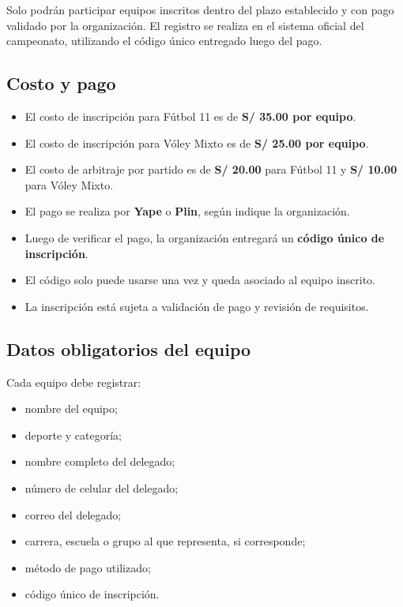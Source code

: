\documentclass[12pt,a4paper]{article}
\begin{document}
Solo podrán participar equipos inscritos dentro del plazo establecido y con pago validado por la organización. El registro se realiza en el sistema oficial del campeonato, utilizando el código único entregado luego del pago.

\subsection{Costo y pago}

\begin{itemize}
  \item El costo de inscripción para Fútbol 11 es de \textbf{S/ 35.00 por equipo}.
  \item El costo de inscripción para Vóley Mixto es de \textbf{S/ 25.00 por equipo}.
  \item El costo de arbitraje por partido es de \textbf{S/ 20.00} para Fútbol 11 y \textbf{S/ 10.00} para Vóley Mixto.
  \item El pago se realiza por \textbf{Yape} o \textbf{Plin}, según indique la organización.
  \item Luego de verificar el pago, la organización entregará un \textbf{código único de inscripción}.
  \item El código solo puede usarse una vez y queda asociado al equipo inscrito.
  \item La inscripción está sujeta a validación de pago y revisión de requisitos.
\end{itemize}

\subsection{Datos obligatorios del equipo}

Cada equipo debe registrar:

\begin{itemize}
  \item nombre del equipo;
  \item deporte y categoría;
  \item nombre completo del delegado;
  \item número de celular del delegado;
  \item correo del delegado;
  \item carrera, escuela o grupo al que representa, si corresponde;
  \item método de pago utilizado;
  \item código único de inscripción.
\end{itemize}
\end{document}

